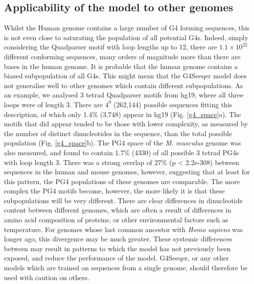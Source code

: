 \documentclass[12pt,a4paper,]{report}
\begin{document}
\hypertarget{applicability-of-the-model-to-other-genomes}{%
\subsection{Applicability of the model to other
genomes}\label{applicability-of-the-model-to-other-genomes}}

Whilst the Human genome contains a large number of G4 forming sequences,
this is not even close to saturating the population of all potential
G4s. Indeed, simply considering the Quadparser motif with loop lengths
up to 12, there are \(1.1\times10^{22}\) different conforming sequences,
many orders of magnitude more than there are bases in the human genome.
It is probable that the human genome contains a biased subpopulation of
all G4s. This might mean that the G4Seeqer model does not generalise
well to other genomes which contain different subpopulations. As an
example, we analysed 3 tetrad Quadparser motifs from hg19, where all
three loops were of length 3. There are \(4^9\) (262,144) possible
sequences fitting this description, of which only 1.4\% (3,748) appear
in hg19 (Fig. \ref{g4_space}a). The motifs that did appear tended to be
those with lower complexity, as measured by the number of distinct
dinucleotides in the sequence, than the total possible population (Fig.
\ref{g4_space}b). The PG4 space of the \emph{M. musculus} genome was
also measured, and found to contain 1.7\% (4330) of all possible 3
tetrad PG4s with loop length 3. There was a strong overlap of 27\% (p
\textless{} 2.2e-308) between sequences in the human and mouse genomes,
however, suggesting that at least for this pattern, the PG4 populations
of these genomes are comparable. The more complex the PG4 motifs become,
however, the more likely it is that these subpopulations will be very
different. There are clear differences in dinucleotide content between
different genomes, which are often a result of differences in amino acid
composition of proteins, or other environmental factors such as
temperature. For genomes whose last common ancestor with \emph{Homo
sapiens} was longer ago, this divergence may be much greater. These
systemic differences between may result in patterns to which the model
has not previously been exposed, and reduce the performance of the
model. G4Seeqer, or any other models which are trained on sequences from
a single genome, should therefore be used with caution on others.

\newpage
\end{document}
